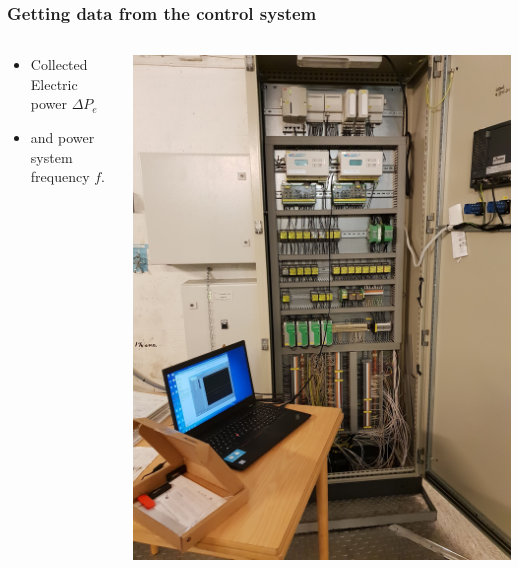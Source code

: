 \begin{frame}
	\frametitle{Getting data from the control system}
	\begin{columns}
		\begin{column}{0.3\textwidth}
			\begin{itemize}
					\item Collected Electric power $\Delta P_e$
				\item and power system frequency $f$.
			\end{itemize}
		\end{column}
		\begin{column}{0.7\textwidth}
			\includegraphics[angle=-90, origin= c, height=\textheight]{./pictures/hymatek.jpg}
		\end{column}
	\end{columns}
\end{frame}
